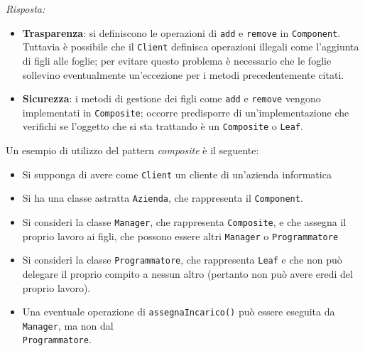 \documentclass{article}
\newenvironment{solution}
    {\textit{Risposta:}}
    {}
\begin{document}
\begin{solution}
\begin{itemize}
\item \textbf{Trasparenza}: si definiscono le operazioni di \texttt{add} e \texttt{remove} in \texttt{Component}.
Tuttavia è possibile che il \texttt{Client} definisca operazioni illegali come l'aggiunta di figli alle foglie; per evitare questo problema è necessario che le foglie sollevino eventualmente un'eccezione per i metodi precedentemente citati.
	\item \textbf{Sicurezza}: i metodi di gestione dei figli come \texttt{add} e \texttt{remove} vengono implementati in \texttt{Composite}; occorre predisporre di un'implementazione che verifichi se l'oggetto che si sta trattando è un \texttt{Composite} o \texttt{Leaf}.
\end{itemize}
Un esempio di utilizzo del pattern \textit{composite} è il seguente:
\begin{itemize}
\item Si supponga di avere come \texttt{Client} un cliente di un'azienda informatica
\item Si ha una classe astratta \texttt{Azienda}, che rappresenta il \texttt{Component}.
\item Si consideri la classe \texttt{Manager}, che rappresenta \texttt{Composite}, e che assegna il proprio lavoro ai figli, che possono essere altri \texttt{Manager} o \texttt{Programmatore}
\item Si consideri la classe \texttt{Programmatore}, che rappresenta \texttt{Leaf} e che non può delegare il proprio compito a nessun altro (pertanto non può avere eredi del proprio lavoro).
\item Una eventuale operazione di \texttt{assegnaIncarico()} può essere eseguita da \texttt{Manager}, ma non dal
\\
\texttt{Programmatore}.
\end{itemize}
\end{solution}
\end{document}
